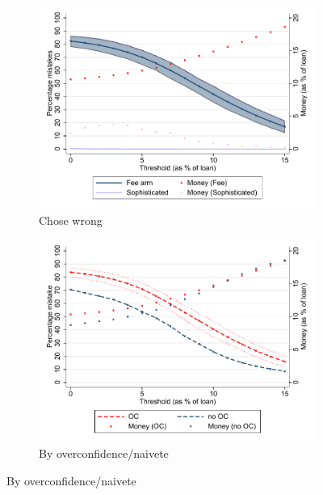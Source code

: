 \documentclass[oneside,11pt]{article}
\begin{document}
\begin{figure}[H]
    \caption{Choice of contracts and treatment effects}
    \label{choose_wrong}
    \begin{center}
        \begin{subfigure}{0.45\textwidth}
        \caption{Chose wrong}
        \centering
        \includegraphics[width=\textwidth]{Figuras/line_cw_eff_te_cf.pdf}
        
    \end{subfigure}
        \begin{subfigure}{0.45\textwidth}
        \caption{By overconfidence/naivete}
        \centering
        \includegraphics[width=\textwidth]{Figuras/line_cw_eff_te_cf_OC_fee.pdf}

    \bigskip
        

\end{subfigure}
\end{center}
\end{figure}
\end{document}
